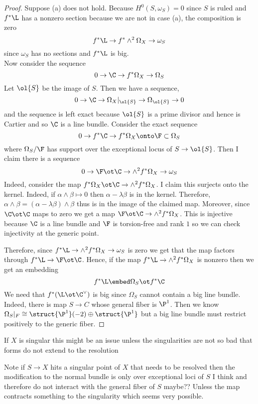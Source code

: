 \documentclass[12pt]{article}
\theoremstyle{plain}
\begin{document}
\begin{proof}
Suppose (a) does not hold.
Because $H^0(S, \omega_S) = 0$ since $S$ is ruled and $f^* \L$ has a nonzero section because we are not in case (a), the composition is zero
\[ f^* \L \to f^* \wedge^2 \Omega_X \to \omega_S \]
since $\omega_S$ has no sections and $f^* \L$ is big. 
\bigskip\\
Now consider the sequence
\[ 0 \to \C \to f^* \Omega_X \to \Omega_S \]
Let $\ol{S}$ be the image of $S$. Then we have a sequence,
\[ 0 \to \C \to \Omega_X |_{\ol{S}} \to \Omega_{\ol{S}} \to 0 \]
and the sequence is left exact because $\ol{S}$ is a prime divisor and hence is Cartier and so $\C$ is a line bundle. 
Consider the exact sequence
\[ 0 \to f^* \C \to f^* \Omega_X \onto \F \subset \Omega_S \]
where $\Omega_S / \F$ has support over the exceptional locus of $S \to \ol{S}$. Then I claim there is a sequence
\[ 0 \to \F \ot \C \to \wedge^2 f^* \Omega_X \to \omega_S \]
Indeed, consider the map $f^* \Omega_X \ot \C \to \wedge^2 f^* \Omega_X$. I claim this surjects onto the kernel. Indeed, if $\alpha \wedge \beta \mapsto 0$ then $\alpha - \lambda \beta$ is in the kernel. Therefore, $\alpha \wedge \beta = (\alpha - \lambda \beta) \wedge \beta$ thus is in the image of the claimed map. Moreover, since $\C \ot \C$ maps to zero we get a map $\F \ot \C \to \wedge^2 f^* \Omega_X$. This is injective because $\C$ is a line bundle and $\F$ is torsion-free and rank $1$ so we can check injectivity at the generic point.
\par 
Therefore, since $f^* \L \to \wedge^2 f^* \Omega_X \to \omega_S$ is zero we get that the map factors through $f^* \L \to \F \ot \C$. Hence, if the map $f^* \L \to \wedge^2 f^* \Omega_X$ is nonzero then we get an embedding
\[ f^* \L \embed \Omega_S \ot f^* \C \]
We need that $f^*(\L \ot \C^\vee)$ is big since $\Omega_S$ cannot contain a big line bundle. Indeed, there is map $S \to C$ whose general fiber is $\P^1$. Then we know $\Omega_S|_F \cong \struct{\P^1}(-2) \oplus \struct{\P^1}$ but a big line bundle must restrict positively to the generic fiber. 
\end{proof}

{\color{red} If $X$ is singular this might be an issue unless the singularities are not so bad that forms do not extend to the resolution}

Note if $S \to X$ hits a singular point of $X$ that needs to be resolved then the modification to the normal bundle is only over exceptional loci of $S$ I think and therefore do not interact with the general fiber of $S$ maybe?? Unless the map contracts something to the singularity which seems very possible. 
\end{document}
